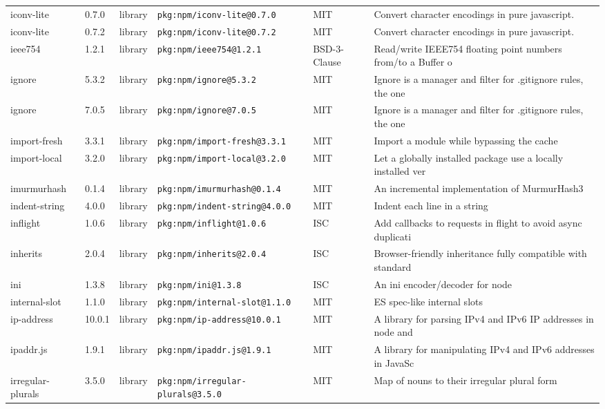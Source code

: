\documentclass[11pt]{article}
\begin{document}
\begin{longtable}{|l|l|l|p{2.2cm}|l|p{4cm}|}
iconv-lite & 0.7.0 & library & \texttt{pkg:npm/iconv-lite@0.7.0} & MIT & Convert character encodings in pure javascript. \\
iconv-lite & 0.7.2 & library & \texttt{pkg:npm/iconv-lite@0.7.2} & MIT & Convert character encodings in pure javascript. \\
ieee754 & 1.2.1 & library & \texttt{pkg:npm/ieee754@1.2.1} & BSD-3-Clause & Read/write IEEE754 floating point numbers from/to a Buffer o \\
ignore & 5.3.2 & library & \texttt{pkg:npm/ignore@5.3.2} & MIT & Ignore is a manager and filter for .gitignore rules, the one \\
ignore & 7.0.5 & library & \texttt{pkg:npm/ignore@7.0.5} & MIT & Ignore is a manager and filter for .gitignore rules, the one \\
import-fresh & 3.3.1 & library & \texttt{pkg:npm/import-fresh@3.3.1} & MIT & Import a module while bypassing the cache \\
import-local & 3.2.0 & library & \texttt{pkg:npm/import-local@3.2.0} & MIT & Let a globally installed package use a locally installed ver \\
imurmurhash & 0.1.4 & library & \texttt{pkg:npm/imurmurhash@0.1.4} & MIT & An incremental implementation of MurmurHash3 \\
indent-string & 4.0.0 & library & \texttt{pkg:npm/indent-string@4.0.0} & MIT & Indent each line in a string \\
inflight & 1.0.6 & library & \texttt{pkg:npm/inflight@1.0.6} & ISC & Add callbacks to requests in flight to avoid async duplicati \\
inherits & 2.0.4 & library & \texttt{pkg:npm/inherits@2.0.4} & ISC & Browser-friendly inheritance fully compatible with standard  \\
ini & 1.3.8 & library & \texttt{pkg:npm/ini@1.3.8} & ISC & An ini encoder/decoder for node \\
internal-slot & 1.1.0 & library & \texttt{pkg:npm/internal-slot@1.1.0} & MIT & ES spec-like internal slots \\
ip-address & 10.0.1 & library & \texttt{pkg:npm/ip-address@10.0.1} & MIT & A library for parsing IPv4 and IPv6 IP addresses in node and \\
ipaddr.js & 1.9.1 & library & \texttt{pkg:npm/ipaddr.js@1.9.1} & MIT & A library for manipulating IPv4 and IPv6 addresses in JavaSc \\
irregular-plurals & 3.5.0 & library & \texttt{pkg:npm/irregular-plurals@3.5.0} & MIT & Map of nouns to their irregular plural form \\

\end{longtable}
\end{document}
